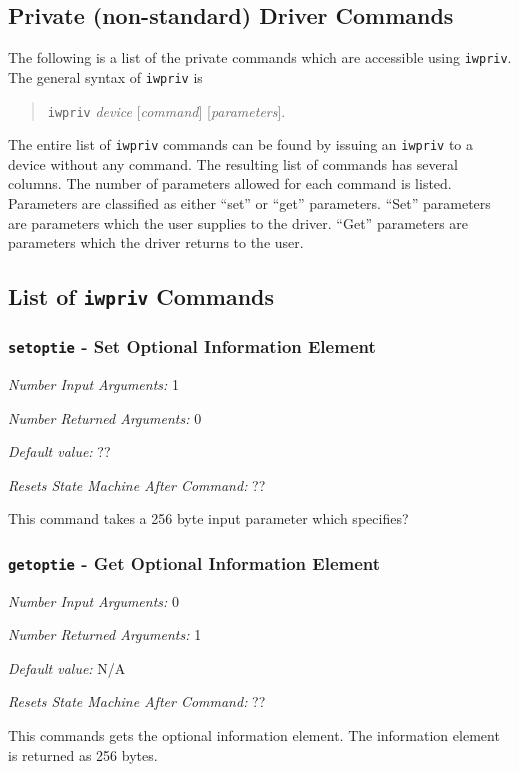 \documentclass[10pt,fullpage]{article}
\newcommand{\mytt}[1]{{\texttt{#1}}}
\newcommand{\bv}{\begin{verse}}
\newcommand{\ev}{\end{verse}}
\newcommand{\argdesc}[4]{\begin{description}
\itemsep -6pt
\item \textit{Number Input Arguments:} #1
\item \textit{Number Returned Arguments:} #2
\item \textit{Default value:} #3
\item \textit{Resets State Machine After Command:} #4
\end{description}
}
\begin{document}
\subsection{Private (non-standard) Driver Commands}
\label{sec:iwprivs}
The following is a list of the private commands which are accessible
using \mytt{iwpriv}.  The general syntax of \mytt{iwpriv} is
\bv
\mytt{iwpriv} \textit{device} [\textit{command}]
[\textit{parameters}].
\ev
The entire list of \mytt{iwpriv} commands can be found by issuing an
\mytt{iwpriv} to a device without any command.  The resulting list of
commands has several columns.  The number of parameters allowed for
each command is listed.  Parameters are classified as either ``set''
or ``get'' parameters.  ``Set'' parameters are parameters which the
user supplies to the driver.  ``Get'' parameters are parameters which
the driver returns to the user.

\subsection{List of \mytt{iwpriv} Commands}

\subsubsection{\mytt{setoptie} - Set Optional Information Element}
\argdesc{1}{0}{??}{??}
This command takes a 256 byte input parameter which specifies?

\subsubsection{\mytt{getoptie} - Get Optional Information Element}
\argdesc{0}{1}{N/A}{??}
This commands gets the optional information element.  The information
element is returned as 256 bytes.
\end{document}
